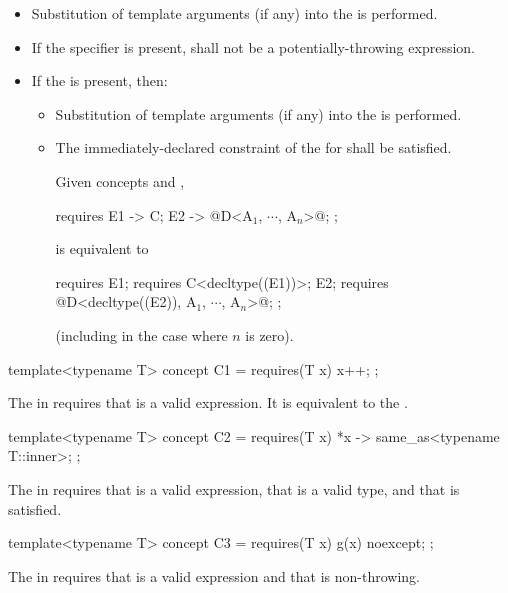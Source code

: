 \begin{itemize}
\item
Substitution of template arguments (if any)
into the  is performed.

\item
If the  specifier is present,
 shall not be a potentially-throwing expression.

\item
If the  is present, then:

\begin{itemize}
\item
Substitution of template arguments (if any)
into the  is performed.

\item
The immediately-declared constraint
of the  for 
shall be satisfied.
\begin{example}
Given concepts  and ,
\begin{codeblock}
requires {
  { E1 } -> C;
  { E2 } -> @D<A$_1$, $\cdots$, A$_n$>@;
};
\end{codeblock}
is equivalent to
\begin{codeblock}
requires {
  E1; requires C<decltype((E1))>;
  E2; requires @D<decltype((E2)), A$_1$, $\cdots$, A$_n$>@;
};
\end{codeblock}
(including in the case where $n$ is zero).
\end{example}
\end{itemize}
\end{itemize}

\pnum
\begin{example}
\begin{codeblock}
template<typename T> concept C1 = requires(T x) {
  {x++};
};
\end{codeblock}
The  in 
requires that  is a valid expression.
It is equivalent to the 
.

\begin{codeblock}
template<typename T> concept C2 = requires(T x) {
  {*x} -> same_as<typename T::inner>;
};
\end{codeblock}

The  in 
requires that  is a valid expression,
that  is a valid type, and
that  is satisfied.

\begin{codeblock}
template<typename T> concept C3 =
  requires(T x) {
    {g(x)} noexcept;
  };
\end{codeblock}

The  in 
requires that  is a valid expression and
that  is non-throwing.
\end{example}


